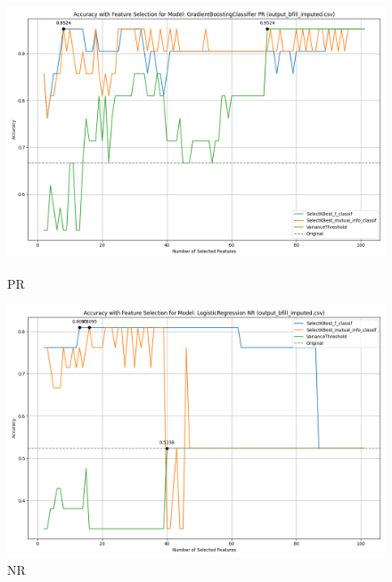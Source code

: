 \begin{figure}[H]
    \centering
    \begin{minipage}[b]{0.45\textwidth}
        \includegraphics[width=\textwidth]{class_all_section/images/feature_selection_accuracy_plot_output_bfill_imputedcsv_GradientBoostingClassifier_PR.png}
        \caption{PR}
        \label{fig:pr_class}
    \end{minipage}
    \hfill
    \begin{minipage}[b]{0.45\textwidth}
        \includegraphics[width=\textwidth]{class_all_section/images/feature_selection_accuracy_plot_output_bfill_imputedcsv_LogisticRegression_NR.png}
        \caption{NR}
        \label{fig:nr_class}
    \end{minipage}
\end{figure}

